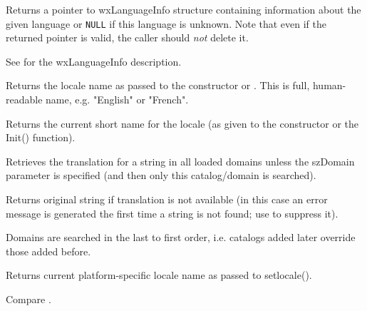 Returns a pointer to wxLanguageInfo structure containing information about the
given language or {\tt NULL} if this language is unknown. Note that even if the
returned pointer is valid, the caller should {\it not} delete it.

See  for the wxLanguageInfo
description.


\label{wxlocalegetlocale}


Returns the locale name as passed to the constructor or 
. This is full, human-readable name,
e.g. "English" or "French".


\label{wxlocalegetname}


Returns the current short name for the locale (as given to the constructor or
the Init() function).

\label{wxlocalegetstring}


Retrieves the translation for a string in all loaded domains unless the szDomain
parameter is specified (and then only this catalog/domain is searched).

Returns original string if translation is not available
(in this case an error message is generated the first time
a string is not found; use  to suppress it).


Domains are searched in the last to first order, i.e. catalogs
added later override those added before.

\label{wxlocalegetsysname}


Returns current platform-specific locale name as passed to setlocale().

Compare .


\label{wxlocalegetsystemencoding}


